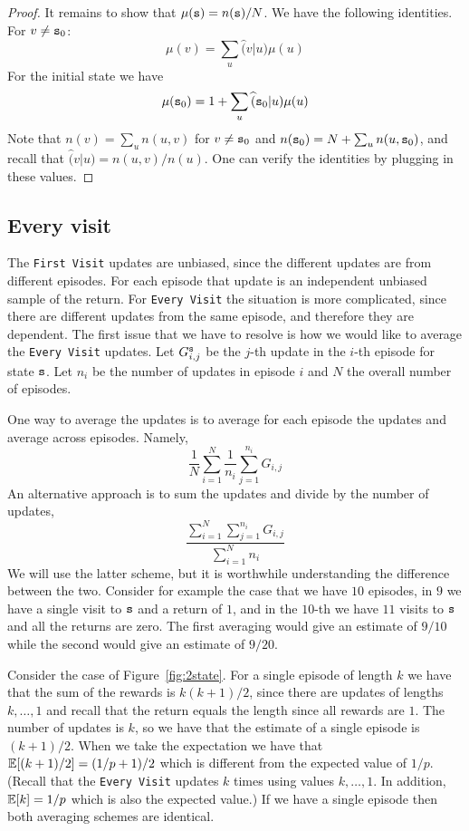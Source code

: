 \begin{advanced}
\begin{proof}
It remains to show that $\mu({\tt s})=n({\tt s})/N$. We have the
following identities. For $v\neq {\tt s}_0$:
\[
\mu(v)=\sum_u \widehat(v|u)\mu(u)
\]
For the initial state we have
\[
\mu({\tt s}_0)=1+ \sum_u \widehat({\tt s}_0|u)\mu(u)
\]
Note that $n(v)=\sum_u n(u,v)$ for $v\neq {\tt s}_0$ and
$n({\tt s}_0)=N+\sum_u n(u,{\tt s}_0)$, and recall that
$\widehat(v|u)=n(u,v)/n(u)$. One can verify the identities by
plugging in these values.
\end{proof}

\subsection{Every visit}

The {\tt First Visit} updates are unbiased, since the different
updates are from different episodes. For each episode that update is
an independent unbiased sample of the return.
%
For {\tt Every Visit} the situation is more complicated, since there
are different updates from the same episode, and therefore they are
dependent. The first issue that we have to resolve is how we would like
to average the {\tt Every Visit} updates. Let $G^{\tt s}_{i,j}$
be the $j$-th update in the $i$-th episode for state ${\tt s}$. Let
$n_i$ be the number of updates in episode $i$ and $N$ the overall
number of episodes.

One way to average the updates is to average for each episode the
updates and average across episodes. Namely,
\[
\frac{1}{N}\sum_{i=1}^N \frac{1}{n_i} \sum_{j=1}^{n_i} G_{i,j}
\]
An alternative approach is to sum the updates and divide by the
number of updates,
\[
\frac{\sum_{i=1}^N\sum_{j=1}^{n_i} G_{i,j}}{\sum_{i=1}^N n_i}
\]
We will use the latter scheme, but it is worthwhile understanding
the difference between the two. Consider for example the case that
we have $10$ episodes, in $9$ we have a single visit to ${\tt s}$ and
a return of $1$, and in the $10$-th we have $11$ visits to ${\tt s}$
and all the returns are zero. The first averaging would give an
estimate of $9/10$ while the second would give an estimate of
$9/20$.

Consider the case of Figure~\ref{fig:2state}. For a single episode
of length $k$ we have that the sum of the rewards is $k(k+1)/2$,
since there are updates of lengths $k, \ldots , 1$ and recall that
the return equals the length since all rewards are $1$. The number
of updates is $k$, so we have that the estimate of a single episode
is $(k+1)/2$. When we take the expectation we have that
$\mathbb{E}[(k+1)/2]=(1/p+1)/2$ which is different from the expected value of
$1/p$. (Recall that the {\tt Every Visit} updates $k$ times using
values $k,\ldots,1$. In addition, $\mathbb{E}[k]=1/p$ which is also the
expected value.) If we have a single episode then both averaging
schemes are identical.


\end{advanced}
